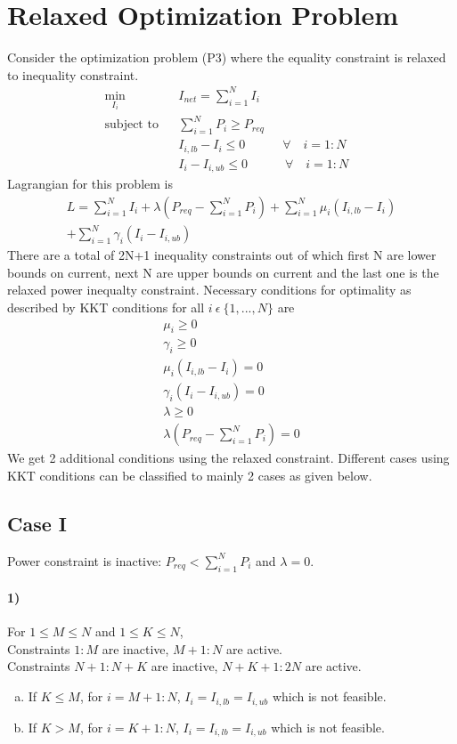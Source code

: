 \documentclass[twocolumn]{autart}
\begin{document}
\section{Relaxed Optimization Problem} \label{red.optim.pbm}
Consider the optimization problem (P3) where the equality constraint is relaxed to inequality constraint.
\begin{subequations}
\label{optim_relaxed}
\begin{align}
& \underset{I_{i}}{\text{min}}
& & I_{net} = \sum_{i=1}^{N}I_{i}  \\
& \text{subject to} & &  \sum_{i=1}^{N} P_{i} \geq P_{req} \label{eq_const}\\
& & & I_{i,lb}-I_{i} \leq 0 \qquad \quad \forall \quad i=1:N & &\\
& & & I_{i} -I_{i,ub}\leq 0 \qquad \quad \forall \quad i=1:N & &
\end{align}
\end{subequations}
Lagrangian for this problem is 
\begin{multline}
L = \sum_{i=1}^N I_i +\lambda \left(P_{req} -\sum_{i=1}^N P_i\right) + \sum_{i=1}^{N} \mu_i (I_{i,lb} - I_i)\\ + \sum_{i=1}^{N}\gamma_i (I_i - I_{i,ub})
\end{multline}
There are a total of 2N+1 inequality constraints out of which first N are lower bounds on current, next N are upper bounds on current and the last one is the relaxed power inequalty constraint. Necessary conditions for optimality as described by KKT conditions for all $i \ \epsilon \ \{1,...,N\}$ are
\begin{gather}
\mu_i \geq 0 \\
\gamma_i \geq 0\\
\mu_i (I_{i,lb}-I_i) = 0  \\ 
\gamma_i (I_i - I_{i,ub}) = 0\\
\lambda \geq 0\\
\lambda (P_{req} - \sum_{i=1}^N P_i) = 0
\end{gather}
We get 2 additional conditions using the relaxed constraint.  Different cases using KKT conditions can be classified to mainly 2 cases as given below.
\subsection*{Case I}
Power constraint is inactive: $P_{req} < \sum_{i=1}^N P_i$ and $\lambda = 0$. 
\paragraph*{1)} For $1 \leq M \leq N$ and $1 \leq K \leq N$, \\
Constraints $1:M$ are inactive, $M+1:N$ are active.\\
Constraints $N+1:N+K$ are inactive, $N+K+1:2N$ are active.
\begin{enumerate}[(a)]
\item If $K \leq M$, for $i = M+1:N$, $I_i = I_{i,lb} = I_{i,ub}$ which is not feasible.
\item If $K > M$, for $i = K+1:N$, $I_i = I_{i,lb} = I_{i,ub}$ which is not feasible.
\end{enumerate}
\end{document}
